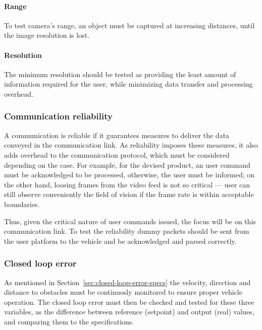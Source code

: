 \paragraph{Range}%
\label{sec:range-test}
To test camera's range, an object must be captured at
increasing distances, until the image resolution is lost.

\paragraph{Resolution}%
\label{sec:resolution-test}
The minimum resolution should be tested as providing the least amount of
information required for the user, while minimizing data transfer and processing overhead.

\subsubsection{Communication reliability}%
\label{sec:comm-reli}
A communication is reliable if it guarantees measures to deliver the data
conveyed in the communication link. As reliability imposes these measures, it
also adds overhead to the communication protocol, which must be considered
depending on the case. For example, for the devised product, an user command
must be acknowledged to be processed, otherwise, the user must be informed; on
the other hand, loosing frames from the video feed is not so critical --- user
can still observe conveniently the field of vision if the frame rate is within
acceptable boundaries. 

Thus, given the critical nature of user commands issued, the focus will be on
this communication link. To test the reliability dummy packets should be sent
from the user platform to the vehicle and be acknowledged and parsed correctly.

\subsubsection{Closed loop error}%
\label{sec:closed-loop-error}
As mentioned in Section~\ref{sec:closed-loop-error-specs} the velocity, direction and distance to obstacles must be continuosly monitored
to ensure proper vehicle operation. The closed loop error must then be checked
and tested for these three variables, as the difference between reference
(setpoint) and output (real) values, and comparing them to the specifications.

